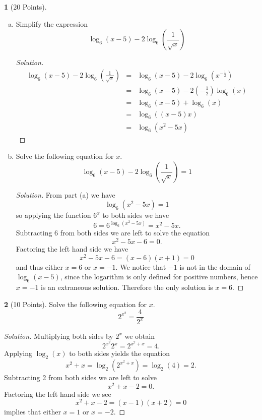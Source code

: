 \documentclass[12pt]{amsart}
\theoremstyle{definition}
\newtheorem{thm}{}
\begin{document}
\begin{thm}[20 Points]
  \begin{enumerate}[(a)]
  \item
    Simplify the expression 
    $$\log_6(x - 5) - 2\log_6\left(\frac{1}{\sqrt{x}}\right)$$
    \begin{proof}[Solution]
      \begin{eqnarray*}
        \log_6(x - 5) - 2\log_6\left(\frac{1}{\sqrt{x}}\right) &=& \log_6(x - 5) - 2\log_6(x^{-\frac{1}{2}})\\
        &=& \log_6(x - 5) - 2\left(-\frac{1}{2}\right)\log_6(x)\\
        &=& \log_6(x - 5) + \log_6(x)\\
        &=& \log_6((x - 5)x)\\
        &=& \log_6(x^2 - 5x)
      \end{eqnarray*}
    \end{proof}
  \item
    Solve the following equation for $x$.
    $$\log_6(x - 5) - 2\log_6\left(\frac{1}{\sqrt{x}}\right) = 1$$
    
    \begin{proof}[Solution]
      From part (a) we have
      $$\log_6(x^2 - 5x) = 1$$
      so applying the function $6^x$ to both sides we have
      $$6 = 6^{\log_6(x^2 - 5x)} = x^2 - 5x.$$
      Subtracting 6 from both sides we are left to solve the equation
      $$x^2 - 5x - 6 = 0.$$
      Factoring the left hand side we have
      $$x^2 - 5x - 6 = (x - 6)(x + 1) = 0$$
      and thus either $x = 6$ or $x = -1$.
      We notice that $-1$ is not in the domain of $\log_6(x - 5)$, since the logarithm is only defined for positive numbers, hence $x = -1$ is an extraneous solution.
      Therefore the only solution is $x = 6$.
    \end{proof}
  \end{enumerate}
\end{thm}

\begin{thm}[10 Points]
  Solve the following equation for $x$.
  $$2^{x^2} = \frac{4}{2^x}$$
\end{thm}

\begin{proof}[Solution]
  Multiplying both sides by $2^x$ we obtain
  $$2^{x^2}2^x = 2^{x^2 + x} = 4.$$
  Applying $\log_2(x)$ to both sides yields the equation
  $$x^2 + x = \log_2(2^{x^2 + x}) = \log_2(4) = 2.$$
  Subtracting 2 from both sides we are left to solve
  $$x^2 + x - 2 = 0.$$
  Factoring the left hand side we see
  $$x^2 + x - 2 = (x - 1)(x + 2) = 0$$
  implies that either $x = 1$ or $x = -2$.
\end{proof}
\end{document}
